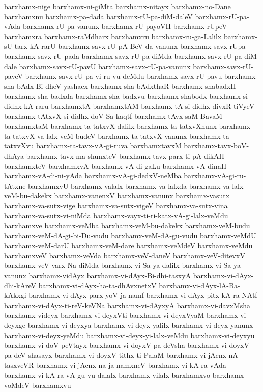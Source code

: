 {barxhamx-nige
barxhamx-ni-giMta
barxhamx-nitayx
barxhamx-no-Dane
barxhamxnu
barxhamx-pa-dada
barxhamx-rU-pa-diM-daleV
barxhamx-rU-pa-vAda
barxhamx-rU-pa-vanunx
barxhamx-rU-payoVH
barxhamx-rUpeV
barxhamxra
barxhamx-raMdharx
barxhamxru
barxhamx-ru-ga-Lalilx
barxhamx-sU-tarx-kA-rarU
barxhamx-savx-rU-pA-BeV-da-vanunx
barxhamx-savx-rUpa
barxhamx-savx-rU-pada
barxhamx-savx-rU-pa-diMda
barxhamx-savx-rU-pa-diM-dale
barxhamx-savx-rU-pavU
barxhamx-savx-rU-pa-vanunx
barxhamx-savx-rU-paveV
barxhamx-savx-rU-pa-vi-ru-vu-deMdu
barxhamx-savx-rU-pavu
barxhamx-sha-bAdx-Bi-dheV-yashacx
barxhamx-sha-bAdxthaR
barxhamx-shabadxH
barxhamx-sha-badxda
barxhamx-sha-badxvu
barxhamx-shabodx
barxhamx-si-didhx-kA-raru
barxhamxtA
barxhamxtAM
barxhamx-tA-si-didhx-divxR-tiVyeV
barxhamx-tAtxvX-si-didhx-doV-Sa-kaqtf
barxhamx-tAvx-saM-BavaM
barxhamxtaM
barxhamx-ta-tatxvX-dalilx
barxhamx-ta-tatxvXnunx
barxhamx-ta-tatxvX-va-lalx-veM-budeV
barxhamx-ta-tatxvX-vanunx
barxhamx-ta-tatxvXvu
barxhamx-ta-tavx-vA-gi-ruva
barxhamxtavxM
barxhamx-tavx-boV-dhAya
barxhamx-tavx-ma-shunxteV
barxhamx-tavx-parx-ti-pA-dikAH
barxhamxteV
barxhamxvA
barxhamx-vA-di-gaLu
barxhamx-vA-dinaH
barxhamx-vA-di-ni-yAda
barxhamx-vA-gi-dedxV-neMba
barxhamx-vA-gi-ru-tAtxne
barxhamxvU
barxhamx-valalx
barxhamx-va-lalxda
barxhamx-va-lalx-veM-bu-dakekx
barxhamx-vanenxV
barxhamx-vanunx
barxhamx-vasutx
barxhamx-va-sutx-vige
barxhamx-va-sutx-vigeV
barxhamx-va-sutx-vina
barxhamx-va-sutx-vi-niMda
barxhamx-vayx-ti-ri-katx-vA-gi-lalx-veMdu
barxhamxve
barxhamx-veMba
barxhamx-veM-bu-dakekx
barxhamx-veM-budu
barxhamx-veM-dA-gi-bi-Du-vudu
barxhamx-veM-dA-gu-vudu
barxhamx-veMdU
barxhamx-veM-darU
barxhamx-veM-dare
barxhamx-veMdeV
barxhamx-veMdu
barxhamxveV
barxhamx-veVda
barxhamx-veV-daneV
barxhamx-veV-ditevxV
barxhamx-veV-varx-Na-diMda
barxhamx-vi-Sa-ya-dalilx
barxhamx-vi-Sa-ya-vanunx
barxhamx-vidAyx
barxhamx-vi-dAyx-Bi-dhi-tasxyA
barxhamx-vi-dAyx-dhi-kAreV
barxhamx-vi-dAyx-ha-ta-dhAvxnetxV
barxhamx-vi-dAyx-lA-Ba-kAkxgi
barxhamx-vi-dAyx-parx-yoV-ja-namf
barxhamx-vi-dAyx-pitx-kA-ra-NAtf
barxhamx-vi-dAyx-ti-reV-keVNa
barxhamx-vi-dAyxyA
barxhamx-vi-davxMsha
barxhamx-videyx
barxhamx-vi-deyxVti
barxhamx-vi-deyxVyaM
barxhamx-vi-deyxge
barxhamx-vi-deyxya
barxhamx-vi-deyx-yalilx
barxhamx-vi-deyx-yanunx
barxhamx-vi-deyx-yeMdu
barxhamx-vi-deyx-yi-lalx-veMdu
barxhamx-vi-deyxyu
barxhamx-vi-doV-peVtayx
barxhamx-vi-doyxV-pa-deVsha
barxhamx-vi-doyxV-pa-deV-shasayx
barxhamx-vi-doyxV-tithx-ti-PalaM
barxhamx-vi-jAcnx-nA-tasxveVR
barxhamx-vi-jAcnx-na-ja-namxneV
barxhamx-vi-kA-ra-vAda
barxhamx-vi-kA-ra-vA-gu-vu-dalalx
barxhamx-vilalx
barxhamxvo
barxhamx-voMdeV
barxhamxvu
}
